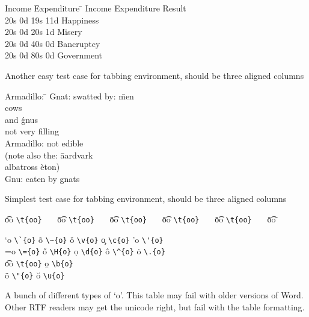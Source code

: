 \documentclass{article}
\begin{document}
\begin{table}
\begin{center}
\begin{tabbing}
Income \=Expenditure \=    \kill
Income \>Expenditure \>Result \\
20s 0d \>19s 11d \>Happiness   \\
20s 0d \>20s 1d  \>Misery    \\
20s 0d \>40s 0d  \>Bancruptcy    \\
20s 0d \>80s 0d  \>Government    \\
\end{tabbing}
\caption{Another easy test case for tabbing environment, should be
three aligned columns}
\end{center}
\end{table}

\begin{table}
\begin{center}
\begin{tabbing}
Armadillo: \=							\kill
Gnat:      \> swatted by: \= men \+\+   \\
                             cows       \\
                      and \' gnus   \-  \\
              not very filling    \-    \\
Armadillo: \> not edible                \\
\pushtabs
(note also the: \= aardvark             \\
                \> albatross \` eton)   \\
\poptabs
Gnu:            \> eaten by  \>    gnats
\end{tabbing}
\caption{Simplest test case for tabbing environment, should be
three aligned columns}
\end{center}
\end{table}

\begin{table}
\centering
\begin{tabbing}
\t{oo} \= \verb|\t{oo}|~~~ \=
\t{oo} \= \verb|\t{oo}|~~~ \=
\t{oo} \= \verb|\t{oo}|~~~ \=
\t{oo} \= \verb|\t{oo}|~~~ \=
\t{oo} \= \verb|\t{oo}|~~~ \=
\t{oo} \=                       \kill

\a`{o} \> \verb|\`{o}|  \> \~{o}  \> \verb|\~{o}|  \> \v{o}  \> \verb|\v{o}| \>
\c{o}  \> \verb|\c{o}|  \> \a'{o} \> \verb|\'{o}|  \\
\a={o} \> \verb|\={o}|  \> \H{o}  \> \verb|\H{o}|  \> \d{o}  \> \verb|\d{o}| \>
\^{o}  \> \verb|\^{o}|  \> \.{o}  \> \verb|\.{o}|  \\
\t{oo} \> \verb|\t{oo}| \> \b{o}  \> \verb|\b{o}|  \\  \"{o} \> \verb|\"{o}| \>
\u{o}  \> \verb|\u{o}|  \\
\end{tabbing}
\caption{A bunch of different types of `o'.  This table may fail with older versions of Word.  Other RTF readers may get the unicode right, but fail with the table formatting.}
\end{table}
\end{document}
